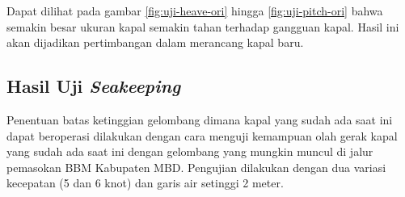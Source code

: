 


Dapat dilihat pada gambar \ref{fig:uji-heave-ori} hingga \ref{fig:uji-pitch-ori} bahwa semakin besar ukuran kapal semakin tahan terhadap gangguan kapal. Hasil ini akan dijadikan pertimbangan dalam merancang kapal baru.

\subsection{Hasil Uji \emph{Seakeeping}}
\label{subsec:hasil-uji-seakeeping}

Penentuan batas ketinggian gelombang dimana kapal yang sudah ada saat ini dapat beroperasi dilakukan dengan cara menguji kemampuan olah gerak kapal yang sudah ada saat ini dengan gelombang yang mungkin muncul di jalur pemasokan BBM Kabupaten MBD. Pengujian dilakukan dengan dua variasi kecepatan (5 dan 6 knot) dan garis air setinggi 2 meter.

